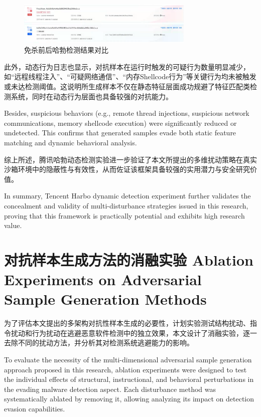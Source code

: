 \begin{figure}[hbt]
	\centering
	\includegraphics[width=0.75\textwidth]{figures/5.2}
	\caption{免杀前后哈勃检测结果对比}\label{fig:5.2}
\end{figure}

此外，动态行为日志也显示，对抗样本在运行时触发的可疑行为数量明显减少，如“远程线程注入”、“可疑网络通信”、“内存Shellcode行为”等关键行为均未被触发或未达检测阈值。这说明所生成样本不仅在静态特征层面成功规避了特征匹配类检测系统，同时在动态行为层面也具备较强的对抗能力。

Besides, suspicious behaviors (e.g., remote thread injections, suspicious network communications, memory shellcode execution) were significantly reduced or undetected.
This confirms that generated samples evade both static feature matching and dynamic behavioral analysis.

综上所述，腾讯哈勃动态检测实验进一步验证了本文所提出的多维扰动策略在真实沙箱环境中的隐蔽性与有效性，从而佐证该框架具备较强的实用潜力与安全研究价值。

In summary, Tencent Harbo dynamic detection experiment further validates the concealment and validity of multi-disturbance strategies issued in this research, proving that this framework is practically potential and exhibits high research value. 

\section{对抗样本生成方法的消融实验 Ablation Experiments on Adversarial Sample Generation Methods}

为了评估本文提出的多架构对抗性样本生成的必要性，计划实验测试结构扰动、指令扰动和行为扰动在逃避恶意软件检测中的独立效果，本文设计了消融实验，逐一去除不同的扰动方法，并分析其对检测系统逃避能力的影响。

To evaluate the necessity of the multi-dimensional adversarial sample generation approach proposed in this research, ablation experiments were designed to test the individual effects of structural, instructional, and behavioral perturbations in the evading malware detection aspect. Each disturbance method was systematically ablated by removing it, allowing analyzing its impact on detection evasion capabilities.

